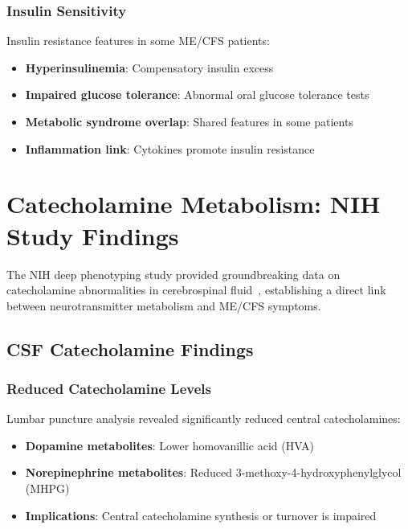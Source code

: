 \subsubsection{Insulin Sensitivity}

Insulin resistance features in some ME/CFS patients:

\begin{itemize}
    \item \textbf{Hyperinsulinemia}: Compensatory insulin excess
    \item \textbf{Impaired glucose tolerance}: Abnormal oral glucose tolerance tests
    \item \textbf{Metabolic syndrome overlap}: Shared features in some patients
    \item \textbf{Inflammation link}: Cytokines promote insulin resistance
\end{itemize}

\section{Catecholamine Metabolism: NIH Study Findings}
\label{sec:catecholamine-metabolism}

The NIH deep phenotyping study provided groundbreaking data on catecholamine abnormalities in cerebrospinal fluid~\cite{walitt2024deep}, establishing a direct link between neurotransmitter metabolism and ME/CFS symptoms.

\subsection{CSF Catecholamine Findings}

\subsubsection{Reduced Catecholamine Levels}

Lumbar puncture analysis revealed significantly reduced central catecholamines:

\begin{itemize}
    \item \textbf{Dopamine metabolites}: Lower homovanillic acid (HVA)
    \item \textbf{Norepinephrine metabolites}: Reduced 3-methoxy-4-hydroxyphenylglycol (MHPG)
    \item \textbf{Implications}: Central catecholamine synthesis or turnover is impaired
\end{itemize}

